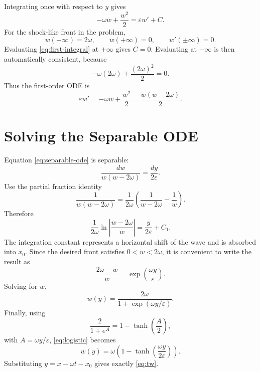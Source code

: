 \documentclass[11pt]{article}
\begin{document}
Integrating once with respect to $y$ gives
\begin{equation}
    -\omega w+\frac{w^2}{2}=\varepsilon w' + C.
    \label{eq:first-integral}
\end{equation}
For the shock-like front in the problem,
\begin{equation}
    w(-\infty)=2\omega,
    \qquad
    w(+\infty)=0,
    \qquad
    w'(\pm\infty)=0.
\end{equation}
Evaluating \eqref{eq:first-integral} at $+\infty$ gives $C=0$.  Evaluating at
$-\infty$ is then automatically consistent, because
\begin{equation}
    -\omega(2\omega)+\frac{(2\omega)^2}{2}=0.
\end{equation}
Thus the first-order ODE is
\begin{equation}
    \varepsilon w'
    =
    -\omega w+\frac{w^2}{2}
    =
    \frac{w(w-2\omega)}{2}.
    \label{eq:separable-ode}
\end{equation}

\section{Solving the Separable ODE}

Equation \eqref{eq:separable-ode} is separable:
\begin{equation}
    \frac{dw}{w(w-2\omega)}
    =
    \frac{dy}{2\varepsilon}.
\end{equation}
Use the partial fraction identity
\begin{equation}
    \frac{1}{w(w-2\omega)}
    =
    \frac{1}{2\omega}
    \left(
    \frac{1}{w-2\omega}-\frac{1}{w}
    \right).
\end{equation}
Therefore
\begin{equation}
    \frac{1}{2\omega}
    \ln\left|\frac{w-2\omega}{w}\right|
    =
    \frac{y}{2\varepsilon}+C_1.
\end{equation}
The integration constant represents a horizontal shift of the wave and is absorbed
into $x_0$.  Since the desired front satisfies $0<w<2\omega$, it is convenient to
write the result as
\begin{equation}
    \frac{2\omega-w}{w}
    =
    \exp\left(\frac{\omega y}{\varepsilon}\right).
\end{equation}
Solving for $w$,
\begin{equation}
    w(y)
    =
    \frac{2\omega}{1+\exp(\omega y/\varepsilon)}.
    \label{eq:logistic}
\end{equation}
Finally, using
\begin{equation}
    \frac{2}{1+e^A}=1-\tanh\left(\frac{A}{2}\right),
\end{equation}
with $A=\omega y/\varepsilon$, \eqref{eq:logistic} becomes
\begin{equation}
    w(y)=
    \omega\left(1-\tanh\left(\frac{\omega y}{2\varepsilon}\right)\right).
\end{equation}
Substituting $y=x-\omega t-x_0$ gives exactly \eqref{eq:tw}.
\end{document}
